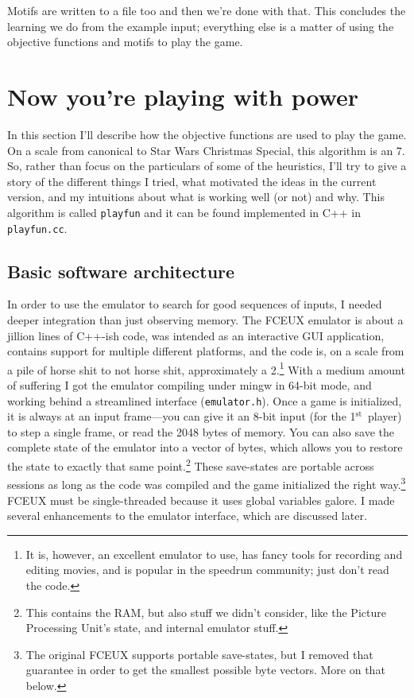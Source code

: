 \documentclass[twocolumn]{article}
\newcommand\st{$^{\mathrm{st}}$}
\begin{document}
Motifs are written to a file too and then we're done with that. This
concludes the learning we do from the example input; everything else
is a matter of using the objective functions and motifs to play the
game.

\section{Now you're playing with power}

In this section I'll describe how the objective functions are used to
play the game. On a scale from canonical to Star Wars Christmas
Special, this algorithm is an 7. So, rather than focus on the
particulars of some of the heuristics, I'll try to give a story of the
different things I tried, what motivated the ideas in the current
version, and my intuitions about what is working well (or not) and
why. This algorithm is called {\tt playfun} and it can be found
implemented in C++ in {\tt playfun.cc}.

\subsection{Basic software architecture}

In order to use the emulator to search for good sequences of inputs, I
needed deeper integration than just observing memory. The FCEUX
emulator is about a jillion lines of C++-ish code, was intended as an
interactive GUI application, contains support for multiple different
platforms, and the code is, on a scale from a pile of horse shit to
not horse shit, approximately a 2.\footnote{It is, however, an
  excellent emulator to use, has fancy tools for recording and editing
  movies, and is popular in the speedrun community; just don't read
  the code.} With a medium amount of suffering I got the emulator
compiling under mingw in 64-bit mode, and working behind a streamlined
interface ({\tt emulator.h}). Once a game is initialized, it is always
at an input frame---you can give it an 8-bit input (for the
1\st\ player) to step a single frame, or read the 2048 bytes of
memory. You can also save the complete state of the emulator into a
vector of bytes, which allows you to restore the state to exactly that
same point.\footnote{This contains the RAM, but also stuff we didn't
  consider, like the Picture Processing Unit's state, and internal
  emulator stuff.} These save-states are portable across sessions as
long as the code was compiled and the game initialized the right
way.\footnote{The original FCEUX supports portable save-states, but I
  removed that guarantee in order to get the smallest possible byte
  vectors. More on that below.} FCEUX must be single-threaded because
it uses global variables galore. I made several enhancements to the
emulator interface, which are discussed later. 
\end{document}
